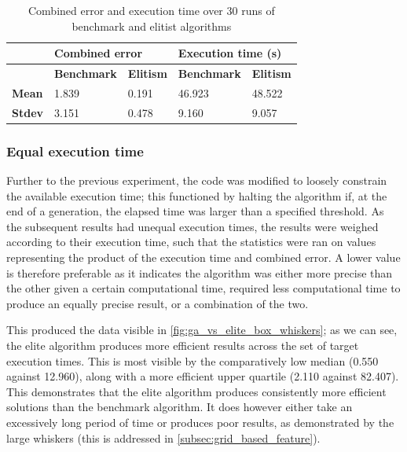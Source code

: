 \documentclass[authoryearcitations]{UoYCSproject}
\begin{document}
\begin{table}
\centering
\begin{tabular}{|l|l|l|l|l|}
\hline & \multicolumn{2}{l|}{\textbf{Combined error}} & \multicolumn{2}{l|}{\textbf{Execution time (s)}} \\ \hline & 
\textbf{Benchmark} & \textbf{Elitism}& \textbf{Benchmark}   & \textbf{Elitism}  \\ \hline 
\textbf{Mean} & 1.839   & 0.191  & 46.923 & 48.522  \\ \hline
\textbf{Stdev}  & 3.151   & 0.478 & 9.160 & 9.057 \\ \hline
\end{tabular}
\caption[Effects of elitist against tournament selection (table)]{Combined error and execution time over 30 runs of benchmark and elitist algorithms}
\label{tab:ga_vs_elite_eq_pop_gen}
\end{table}

\subsubsection{Equal execution time}
\label{subsec:ga_vs_elite_time_sweep}
Further to the previous experiment, the code was modified to loosely constrain the available execution time; this functioned by halting the algorithm if, at the end of a generation, the elapsed time was larger than a specified threshold. As the subsequent results had unequal execution times, the results were weighed according to their execution time, such that the statistics were ran on values representing the product of the execution time and combined error. A lower value is therefore preferable as it indicates the algorithm was either more precise than the other given a certain computational time, required less computational time to produce an equally precise result, or a combination of the two. \newline

This produced the data visible in \autoref{fig:ga_vs_elite_box_whiskers}; as we can see, the elite algorithm produces more efficient results across the set of target execution times. This is most visible by the comparatively low median (0.550 against 12.960), along with a more efficient upper quartile (2.110 against 82.407). This demonstrates that the elite algorithm produces consistently more efficient solutions than the benchmark algorithm. It does however either take an excessively long period of time or produces poor results, as demonstrated by the large whiskers (this is addressed in \autoref{subsec:grid_based_feature}).
\end{document}
